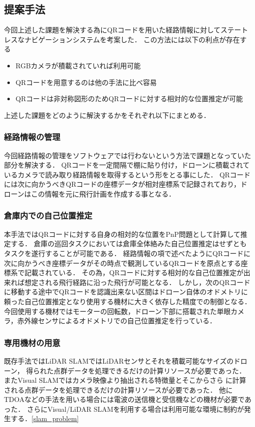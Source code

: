 \subsection{提案手法}
今回上述した課題を解決する為にQRコードを用いた経路情報に対してステートレスなナビゲーションシステムを考案した．
この方法には以下の利点が存在する
\begin{itemize}
    \item RGBカメラが積載されていれば利用可能
    \item QRコードを用意するのは他の手法に比べ容易
    \item QRコードは非対称図形のためQRコードに対する相対的な位置推定が可能
\end{itemize}
上述した課題をどのように解決するかをそれぞれ以下にまとめる．

\subsubsection{経路情報の管理}
今回経路情報の管理をソフトウェアでは行わないという方法で課題となっていた部分を解決する．
QRコードを一定間隔で棚に貼り付け，ドローンに積載されているカメラで読み取り経路情報を取得するという形をとる事にした．
QRコードには次に向かうべきQRコードの座標データが相対座標系で記録されており，ドローンはこの情報を元に飛行計画を作成する事となる．

\subsubsection{倉庫内での自己位置推定}
本手法ではQRコードに対する自身の相対的な位置をPnP問題として計算して推定する．
倉庫の巡回タスクにおいては倉庫全体絡みた自己位置推定はせずともタスクを遂行することが可能である．
経路情報の項で述べたようにQRコードに次に向かうべき座標データがその時点で観測しているQRコードを原点とする座標系で記載されている．
その為，QRコードに対する相対的な自己位置推定が出来れば想定される飛行経路に沿った飛行が可能となる．
しかし，次のQRコードに移動する途中でQRコードを認識出来ない区間はドローン自体のオドメトリに頼った自己位置推定となり使用する機材に大きく依存した精度での制御となる．
今回使用する機材ではモーターの回転数，ドローン下部に搭載された単眼カメラ，赤外線センサによるオドメトリでの自己位置推定を行っている．

\subsubsection{専用機材の用意}
既存手法ではLiDAR SLAMではLiDARセンサとそれを積載可能なサイズのドローン，
得られた点群データを処理できるだけの計算リソースが必要であった．
またVisual SLAMではカメラ映像より抽出される特徴量とそこからさら
に計算される点群データを処理できるだけの計算リソースが必要であった．
他にTDOAなどの手法を用いる場合には電波の送信機と受信機などの機材が必要であった．
さらにVisual/LiDAR SLAMを利用する場合は利用可能な環境に制約が発生する．\ref{slam_problem}

